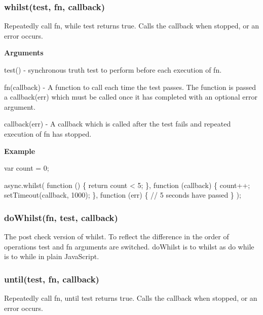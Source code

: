\label{_whilst}%
 \subsubsection*{whilst(test, fn, callback)}

Repeatedly call fn, while test returns true. Calls the callback when stopped, or an error occurs.

{\bfseries Arguments}


\begin{DoxyItemize}
\item test() -\/ synchronous truth test to perform before each execution of fn.
\item fn(callback) -\/ A function to call each time the test passes. The function is passed a callback(err) which must be called once it has completed with an optional error argument.
\item callback(err) -\/ A callback which is called after the test fails and repeated execution of fn has stopped.
\end{DoxyItemize}

{\bfseries Example}


\begin{DoxyCode}
var count = 0;

async.whilst(
    function () \{ return count < 5; \},
    function (callback) \{
        count++;
        setTimeout(callback, 1000);
    \},
    function (err) \{
        // 5 seconds have passed
    \}
);
\end{DoxyCode}
 



\label{_doWhilst}%
 \subsubsection*{do\+Whilst(fn, test, callback)}

The post check version of whilst. To reflect the difference in the order of operations {\ttfamily test} and {\ttfamily fn} arguments are switched. {\ttfamily do\+Whilst} is to {\ttfamily whilst} as {\ttfamily do while} is to {\ttfamily while} in plain Java\+Script. 



\label{_until}%
 \subsubsection*{until(test, fn, callback)}

Repeatedly call fn, until test returns true. Calls the callback when stopped, or an error occurs.

